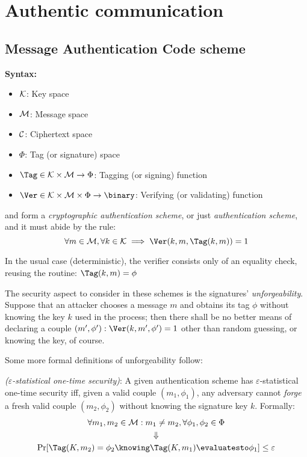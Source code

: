 
\section{Authentic communication}


\subsection{Message Authentication Code scheme}

\textbf{Syntax:}

\begin{itemize}
    \item $\mathcal{K}$: Key space
    \item $\mathcal{M}$: Message space
    \item $\mathcal{C}$: Ciphertext space
    \item $\Phi$: Tag (or signature) space
    \item $\Tag \in \K \times \M \to \Phi$: Tagging (or signing) function
    \item $\Ver \in \K \times \M \times \Phi \to \binary$: Verifying (or validating) function
\end{itemize}

\Tag{} and \Ver{} form a \emph{cryptographic authentication scheme}, or just \emph{authentication scheme}, and it must abide by the rule:
\[
    \forall m \in \M, \forall k \in \K \implies \Ver(k, m, \Tag(k, m)) = 1
\]

In the usual case (deterministic), the verifier consists only of an equality check, reusing the \Tag{} routine: $\Tag(k, m) = \phi$

The security aspect to consider in these schemes is the signatures' \emph{unforgeability}. Suppose that an attacker chooses a message $m$ and obtains its tag $\phi$ without knowing the key $k$ used in the process; then there shall be no better means of declaring a couple $(m', \phi') : \Ver(k, m', \phi') = 1$ other than random guessing, or knowing the key, of course.

Some more formal definitions of unforgeability follow:

\begin{definition} \emph{($\varepsilon$-statistical one-time security)}:
    A given authentication scheme has $\varepsilon$-statistical one-time security iff, given a valid couple $(m_1, \phi_1)$, any adversary cannot \emph{forge} a fresh valid couple $(m_2, \phi_2)$ without knowing the signature key $k$. Formally:
    \begin{gather*}
        \forall m_1, m_2 \in \M : m_1 \neq m_2, \forall \phi_1, \phi_2 \in \Phi \\
        \Downarrow \\
        \Pr[\Tag(K, m_2) = \phi_2 \knowing \Tag(K, m_1) \evaluatesto \phi_1] \leq \varepsilon
    \end{gather*}
\end{definition}

